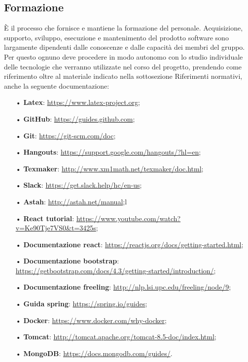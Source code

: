 \subsection{Formazione}
È il processo che fornisce e mantiene la formazione del personale. Acquisizione, supporto, sviluppo, esecuzione e mantenimento 
del prodotto software sono largamente dipendenti dalle conoscenze e dalle capacità dei membri del gruppo. 
\newline
Per questo ognuno deve procedere in modo autonomo con lo studio individuale delle tecnologie che verranno utilizzate nel corso del progetto, prendendo come riferimento oltre al materiale indicato nella sottosezione Riferimenti normativi, anche la seguente documentazione:
\begin{itemize}
\item[•] \textbf{Latex}: \url{https://www.latex-project.org};
\item[•] \textbf{GitHub}: \url{https://guides.github.com};
\item[•] \textbf{Git}: \url{https://git-scm.com/doc};
\item[•] \textbf{Hangouts}: \url{https://support.google.com/hangouts/?hl=en};
\item[•] \textbf{Texmaker}: \url{http://www.xm1math.net/texmaker/doc.html};
\item[•] \textbf{Slack}: \url{https://get.slack.help/hc/en-us};
\item[•] \textbf{Astah}: \url{http://astah.net/manual};l
\item[•] \textbf{React tutorial}: \url{https://www.youtube.com/watch?v=Ke90Tje7VS0&t=3425s};
\item[•] \textbf{Documentazione react}: \url{https://reactjs.org/docs/getting-started.html};
\item[•] \textbf{Documentazione bootstrap}: \url{https://getbootstrap.com/docs/4.3/getting-started/introduction/};
\item[•] \textbf{Documentazione freeling}: \url{http://nlp.lsi.upc.edu/freeling/node/9};
\item[•] \textbf{Guida spring}: \url{https://spring.io/guides};
\item[•] \textbf{Docker}: \url{https://www.docker.com/why-docker};
\item[•] \textbf{Tomcat}: \url{http://tomcat.apache.org/tomcat-8.5-doc/index.html};
\item[•] \textbf{MongoDB}: \url{https://docs.mongodb.com/guides/}.
\end{itemize}